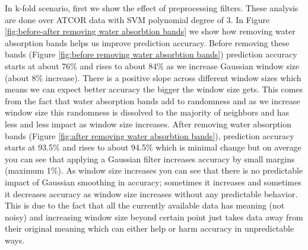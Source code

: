 \documentclass[remotesensing,article,accept,moreauthors,pdftex,12pt,a4paper]{mdpi}
\begin{document}
In k-fold scenario, first we show the effect of preprocessing filters. These analysis are done over ATCOR data with SVM polynomial degree of 3. In Figure \ref{fig:before-after removing water absorbtion bands} we show how removing water absorption bands helps us improve prediction accuracy. Before removing these bands (Figure \ref{fig:before removing water absorbtion bands}) prediction accuracy starts at about 76\% and rises to about 84\% as we increase Gaussian window size (about 8\% increase). There is a positive slope across different window sizes which means we can expect better accuracy the bigger the window size gets. This comes from the fact that water absorption bands add to randomness and as we increase window size this randomness is dissolved to the majority of neighbors and has less and less impact as window size increases. After removing water absorption bands (Figure \ref{fig:after removing water absorbtion bands}), prediction accuracy starts at 93.5\% and rises to about 94.5\% which is minimal change but on average you can see that applying a Gaussian filter increases accuracy by small margins (maximum 1\%). As window size increases you can see that there is no predictable impact of Gaussian smoothing in accuracy; sometimes it increases and sometimes it decreases accuracy as window size increases without any predictable behavior. This is due to the fact that all the currently available data has meaning (not noisy) and increasing window size beyond certain point just takes data away from their original meaning which can either help or harm accuracy in unpredictable ways. 
\end{document}
